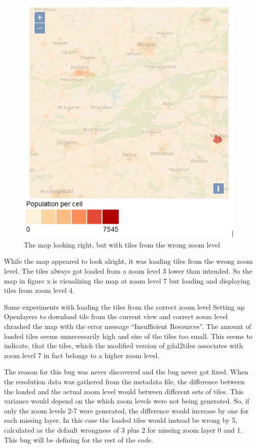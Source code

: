 \begin{figure} [H]
	\centering
	\includegraphics[width=.8\textwidth]{Pictures/MapWithWrongResolution}
	\caption{The map looking right, but with tiles from the wrong zoom level}
	\label{MapWithWrongResolution}
\end{figure}


While the map appeared to look alright, it was loading tiles from the wrong zoom level. The tiles always got loaded from a zoom level 3 lower than intended. So the map in figure x is visualizing the map at zoom level 7 but loading and displaying tiles from zoom level 4.

Some experiments with loading the tiles from the correct zoom level 
Setting up Openlayers to download tile from the current view and correct zoom level chrashed the map with the error message “Insufficient Resources”. The amount of loaded tiles seems unnecessarily high and size of the tiles too small. This seems to indicate, that the tiles, which the modified version of gdal2tiles associates with zoom level 7 in fact belongs to a higher zoom level.

The reason for this bug was never discovered and the bug never got fixed. When the resolution data was gathered from the metadata file, the difference between the loaded and the actual zoom level would between different sets of tiles. This variance would depend on the which zoom levels were not being generated. So, if only the zoom levels 2-7 were generated, the difference would increase by one for each missing layer. In this case the loaded tiles would instead be wrong by 5, calculated as the default wrongness of 3 plus 2 for missing zoom layer 0 and 1. 
This bug will be defining for the rest of the code.



